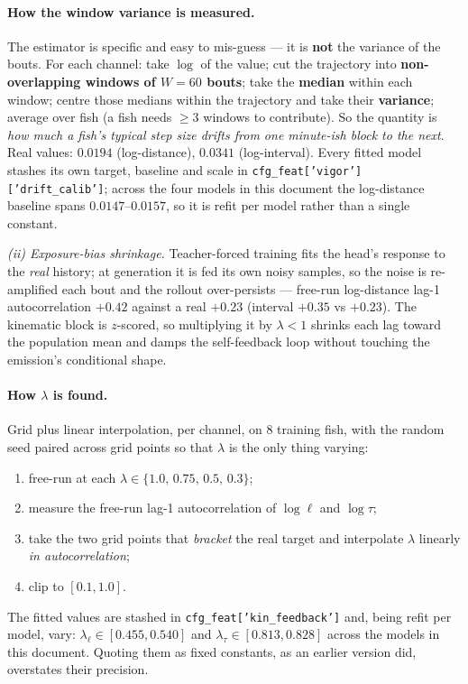 \documentclass[11pt,a4paper]{article}
\newcommand{\code}[1]{\texttt{\small #1}}
\begin{document}
\paragraph{How the window variance is measured.} The estimator is specific and easy to
mis-guess --- it is \textbf{not} the variance of the bouts. For each channel:
take $\log$ of the value; cut the trajectory into \textbf{non-overlapping windows of
$W=60$ bouts}; take the \textbf{median} within each window; centre those medians within
the trajectory and take their \textbf{variance}; average over fish (a fish needs
$\ge3$ windows to contribute). So the quantity is \emph{how much a fish's typical step size
drifts from one minute-ish block to the next}. Real values: $0.0194$ (log-distance),
$0.0341$ (log-interval). Every fitted model stashes its own target, baseline and scale in
\code{cfg\_feat['vigor']['drift\_calib']}; across the four models in this document the
log-distance baseline spans $0.0147$--$0.0157$, so it is refit per model rather than a
single constant.

\emph{(ii) Exposure-bias shrinkage.} Teacher-forced training fits the head's response to
the \emph{real} history; at generation it is fed its own noisy samples, so the noise is
re-amplified each bout and the rollout over-persists --- free-run log-distance lag-1
autocorrelation $+0.42$ against a real $+0.23$ (interval $+0.35$ vs $+0.23$). The kinematic
block is $z$-scored, so multiplying it by $\lambda<1$ shrinks each lag toward the population
mean and damps the self-feedback loop without touching the emission's conditional shape.

\paragraph{How $\lambda$ is found.} Grid plus linear interpolation, per channel, on 8
training fish, with the random seed paired across grid points so that $\lambda$ is the only
thing varying:
\begin{enumerate}\itemsep1pt
\item free-run at each $\lambda \in \{1.0,\,0.75,\,0.5,\,0.3\}$;
\item measure the free-run lag-1 autocorrelation of $\log\ell$ and $\log\tau$;
\item take the two grid points that \emph{bracket} the real target and interpolate
      $\lambda$ linearly \emph{in autocorrelation};
\item clip to $[0.1,1.0]$.
\end{enumerate}
The fitted values are stashed in \code{cfg\_feat['kin\_feedback']} and, being refit per
model, vary: $\lambda_{\ell} \in [0.455, 0.540]$ and $\lambda_{\tau} \in [0.813, 0.828]$
across the models in this document. Quoting them as fixed constants, as an earlier version
did, overstates their precision.
\end{document}
